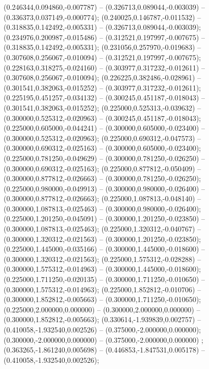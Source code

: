  (0.246344,0.094860,-0.007787) -- (0.326713,0.089044,-0.003039) -- (0.336373,0.037149,-0.000774);
 (0.240025,0.146787,-0.011532) -- (0.318835,0.142492,-0.005331) -- (0.326713,0.089044,-0.003039);
 (0.234976,0.200987,-0.015486) -- (0.312521,0.197997,-0.007675) -- (0.318835,0.142492,-0.005331);
 (0.231056,0.257970,-0.019683) -- (0.307608,0.256067,-0.010094) -- (0.312521,0.197997,-0.007675);
 (0.228163,0.318275,-0.024160) -- (0.303977,0.317232,-0.012611) -- (0.307608,0.256067,-0.010094);
 (0.226225,0.382486,-0.028961) -- (0.301541,0.382063,-0.015252) -- (0.303977,0.317232,-0.012611);
 (0.225195,0.451257,-0.034132) -- (0.300245,0.451187,-0.018043) -- (0.301541,0.382063,-0.015252);
 (0.225000,0.525313,-0.039632) -- (0.300000,0.525312,-0.020963) -- (0.300245,0.451187,-0.018043);
 (0.225000,0.605000,-0.044241) -- (0.300000,0.605000,-0.023400) -- (0.300000,0.525312,-0.020963);
 (0.225000,0.690312,-0.047573) -- (0.300000,0.690312,-0.025163) -- (0.300000,0.605000,-0.023400);
 (0.225000,0.781250,-0.049629) -- (0.300000,0.781250,-0.026250) -- (0.300000,0.690312,-0.025163);
 (0.225000,0.877812,-0.050409) -- (0.300000,0.877812,-0.026663) -- (0.300000,0.781250,-0.026250);
 (0.225000,0.980000,-0.049913) -- (0.300000,0.980000,-0.026400) -- (0.300000,0.877812,-0.026663);
 (0.225000,1.087813,-0.048140) -- (0.300000,1.087813,-0.025463) -- (0.300000,0.980000,-0.026400);
 (0.225000,1.201250,-0.045091) -- (0.300000,1.201250,-0.023850) -- (0.300000,1.087813,-0.025463);
 (0.225000,1.320312,-0.040767) -- (0.300000,1.320312,-0.021563) -- (0.300000,1.201250,-0.023850);
 (0.225000,1.445000,-0.035166) -- (0.300000,1.445000,-0.018600) -- (0.300000,1.320312,-0.021563);
 (0.225000,1.575312,-0.028288) -- (0.300000,1.575312,-0.014963) -- (0.300000,1.445000,-0.018600);
 (0.225000,1.711250,-0.020135) -- (0.300000,1.711250,-0.010650) -- (0.300000,1.575312,-0.014963);
 (0.225000,1.852812,-0.010706) -- (0.300000,1.852812,-0.005663) -- (0.300000,1.711250,-0.010650);
 (0.225000,2.000000,0.000000) -- (0.300000,2.000000,0.000000) -- (0.300000,1.852812,-0.005663);
 (0.330614,-1.939839,0.002757) -- (0.410058,-1.932540,0.002526) -- (0.375000,-2.000000,0.000000);
 (0.300000,-2.000000,0.000000) -- (0.375000,-2.000000,0.000000) ;
 (0.363265,-1.861240,0.005698) -- (0.446853,-1.847531,0.005178) -- (0.410058,-1.932540,0.002526);
